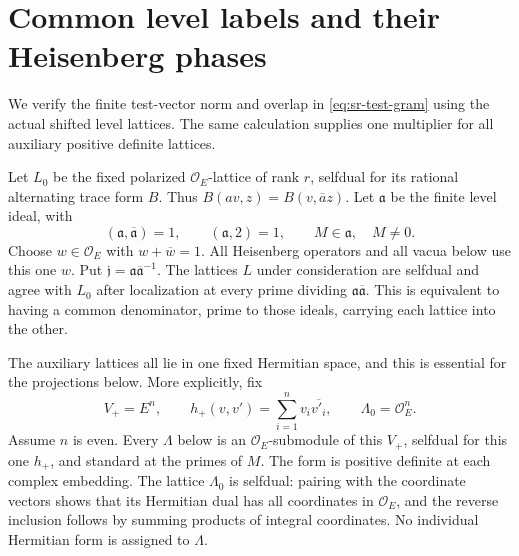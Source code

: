 \section{Common level labels and their Heisenberg phases}
\label{sec:sr-level-phase-proof}

We verify the finite test-vector norm and overlap in
\eqref{eq:sr-test-gram} using the actual shifted level lattices.
The same calculation supplies one multiplier for all auxiliary
positive definite lattices.

Let \(L_0\) be the fixed polarized \(\mathcal O_E\)-lattice of
rank \(r\), selfdual for its rational alternating trace form
\(B\).  Thus \(B(av,z)=B(v,\overline a z)\).
Let \(\mathfrak a\) be the finite level ideal, with
\[
 (\mathfrak a,\overline{\mathfrak a})=1,\qquad
 (\mathfrak a,2)=1,\qquad M\in\mathfrak a,\quad M\ne0.
\]
Choose \(w\in\mathcal O_E\) with \(w+\overline w=1\).
All Heisenberg operators and all vacua below use this one \(w\).
Put \(\mathfrak j=\mathfrak a\overline{\mathfrak a}^{-1}\).
The lattices \(L\) under consideration are selfdual and agree
with \(L_0\) after localization at every prime dividing
\(\mathfrak a\overline{\mathfrak a}\).
This is equivalent to having a common denominator, prime to
those ideals, carrying each lattice into the other.

The auxiliary lattices all lie in one fixed Hermitian space,
and this is essential for the projections below.  More explicitly,
fix
\[
 V_+=E^n,\qquad
 h_+(v,v')=\sum_{i=1}^n v_i\overline{v'_i},\qquad
 \Lambda_0=\mathcal O_E^n.
\]
Assume \(n\) is even.  Every \(\Lambda\) below is an
\(\mathcal O_E\)-submodule of this \(V_+\), selfdual for this
one \(h_+\), and standard at the primes of \(M\).
The form is positive definite at each complex embedding.
The lattice \(\Lambda_0\) is selfdual: pairing with the coordinate
vectors shows that its Hermitian dual has all coordinates in
\(\mathcal O_E\), and the reverse inclusion follows by summing
products of integral coordinates.  No individual Hermitian form
is assigned to \(\Lambda\).

